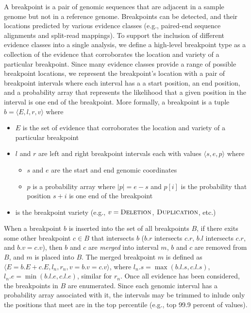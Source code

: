 \documentclass[11pt]{article}
\begin{document}
A breakpoint is a pair of genomic sequences that are adjacent in a sample genome
but not in a reference genome. Breakpoints can be detected, and their locations
predicted by various evidence classes (e.g., paired-end sequence alignments and
split-read mappings).  To support the inclusion of different evidence classes
into a single analysis, we define a high-level breakpoint type as a collection
of the evidence that corroborates the location and variety of a particular
breakpoint.  Since many evidence classes provide a range of possible breakpoint
locations, we represent the breakpoint's location with a pair of breakpoint
intervals where each interval has a a start position, an end position, and a
probability array that represents the likelihood that a given position in the
interval is one end of the breakpoint.  More formally, a breakpoint is a tuple 
$b=\langle E,l,r,v \rangle$ where
\begin{itemize}
\item $E$ is the set of evidence that corroborates the location and variety of a
particular breakpoint
\item $l$ and $r$ are left and right breakpoint intervals each with values
	$\langle s, e, p \rangle$ where
	\begin{itemize}
		\item $s$ and $e$ are the start and end genomic coordinates
		\item $p$ is a probability array where $|p|=e-s$ and $p[i]$ is the
		probability that position $s+i$ is one end of the breakpoint
	\end{itemize}
\item  is the breakpoint variety (e.g., $v=\textsc{Deletion}$,
$\textsc{Duplication}$, etc.)
\end{itemize}

When a breakpoint $b$ is inserted into the set of all breakpoints $B$, if there
exits some other breakpoint $c \in B$ that intersects $b$ ($b.r$
intersects $c.r$, $b.l$ intersects $c.r$, and $b.v = c.v$), then $b$ and $c$
are {\em merged} into interval $m$, $b$ and $c$ are removed from $B$, and $m$ is
placed into $B$.  The merged breakpoint $m$ is defined as
$\langle E = b.E + c.E, l_n, r_n, v = b.v = c.v\rangle$, where 
$l_n.s = \max(b.l.s, c.l.s)$, $l_n.e = \min(b.l.e, c.l.e)$, similar for 
$r_n$.  Once all evidence has been considered, the breakpoints in $B$ are
enumerated.  Since each genomic interval has a probability array associated with
it, the intervals may be trimmed to inlude only the positions that meet are
in the top percentile (e.g., top 99.9 percent of values).
\end{document}
